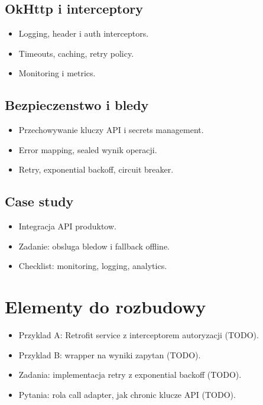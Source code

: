 \subsection{OkHttp i interceptory}
\begin{itemize}
  \item Logging, header i auth interceptors.
  \item Timeouts, caching, retry policy.
  \item Monitoring i metrics.
\end{itemize}

\subsection{Bezpieczenstwo i bledy}
\begin{itemize}
  \item Przechowywanie kluczy API i secrets management.
  \item Error mapping, sealed wynik operacji.
  \item Retry, exponential backoff, circuit breaker.
\end{itemize}

\subsection{Case study}
\begin{itemize}
  \item Integracja API produktow.
  \item Zadanie: obsluga bledow i fallback offline.
  \item Checklist: monitoring, logging, analytics.
\end{itemize}

\section{Elementy do rozbudowy}
\begin{itemize}
  \item Przyklad A: Retrofit service z interceptorem autoryzacji (TODO).
  \item Przyklad B: wrapper na wyniki zapytan (TODO).
  \item Zadania: implementacja retry z exponential backoff (TODO).
  \item Pytania: rola call adapter, jak chronic klucze API (TODO).
\end{itemize}


